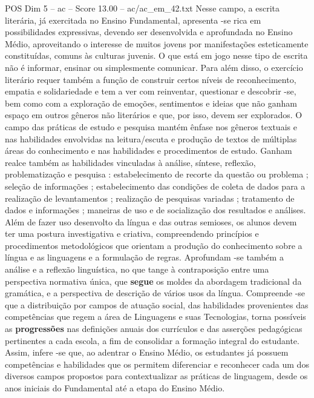 \begin{textsample}{POS Dim 5 – ac – Score 13.00 – ac/ac\_em\_42.txt}
Nesse campo, a escrita literária, já exercitada no Ensino Fundamental, apresenta -se rica em possibilidades expressivas, devendo ser desenvolvida e aprofundada no Ensino Médio, aproveitando o interesse de muitos jovens por manifestações esteticamente constituídas, comuns às culturas juvenis.
O que está em jogo nesse tipo de escrita não é informar, ensinar ou simplesmente comunicar.
Para além disso, o exercício literário requer também a função de construir certos níveis de reconhecimento, empatia e solidariedade e tem a ver com reinventar, questionar e descobrir -se, bem como com a exploração de emoções, sentimentos e ideias que não ganham espaço em outros gêneros não literários e que, por isso, devem ser explorados.
O campo das práticas de estudo e pesquisa mantém ênfase nos gêneros textuais e nas habilidades envolvidas na leitura/escuta e produção de textos de múltiplas áreas do conhecimento e nas habilidades e procedimentos de estudo.
Ganham realce também as habilidades vinculadas à análise, síntese, reflexão, problematização e pesquisa : estabelecimento de recorte da questão ou problema ; seleção de informações ; estabelecimento das condições de coleta de dados para a realização de levantamentos ; realização de pesquisas variadas ; tratamento de dados e informações ; maneiras de uso e de socialização dos resultados e análises.
Além de fazer uso desenvolto da língua e das outras semioses, os alunos devem ter uma postura investigativa e criativa, compreendendo princípios e procedimentos metodológicos que orientam a produção do conhecimento sobre a língua e as linguagens e a formulação de regras.
Aprofundam -se também a análise e a reflexão linguística, no que tange à contraposição entre uma perspectiva normativa única, que \textbf{segue} os moldes da abordagem tradicional da gramática, e a perspectiva de descrição de vários usos da língua.
Compreende -se que a distribuição por campos de atuação social, das habilidades provenientes das competências que regem a área de Linguagens e suas Tecnologias, torna possíveis as \textbf{progressões} nas definições anuais dos currículos e das asserções pedagógicas pertinentes a cada escola, a fim de consolidar a formação integral do estudante.
Assim, infere -se que, ao adentrar o Ensino Médio, os estudantes já possuem competências e habilidades que os permitem diferenciar e reconhecer cada um dos diversos campos propostos para contextualizar as práticas de linguagem, desde os anos iniciais do Fundamental até a etapa do Ensino Médio.

\end{textsample}
